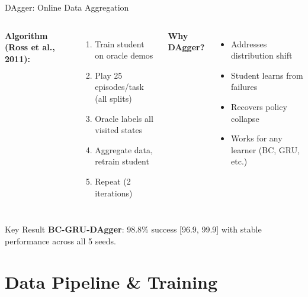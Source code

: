 \documentclass[10pt,aspectratio=16:9]{beamer}
\begin{document}
\begin{frame}{DAgger: Online Data Aggregation}
  \begin{columns}
    \textbf{Algorithm (Ross et al., 2011):}
    \begin{enumerate}
      \item Train student on oracle demos
      \item Play 25 episodes/task (all splits)
      \item Oracle labels all visited states
      \item Aggregate data, retrain student
      \item Repeat (2 iterations)
    \end{enumerate}

    \textbf{Why DAgger?}
    \begin{itemize}
      \item Addresses distribution shift
      \item Student learns from failures
      \item Recovers policy collapse
      \item Works for any learner (BC, GRU, etc.)
    \end{itemize}
  \end{columns}

  \vspace{0.8em}

  \begin{alertblock}{Key Result}
    \centering
    \textbf{BC-GRU-DAgger}: 98.8\% success [96.9, 99.9] with stable performance across all 5 seeds.
  \end{alertblock}
\end{frame}

\section{Data Pipeline \& Training}
\end{document}
